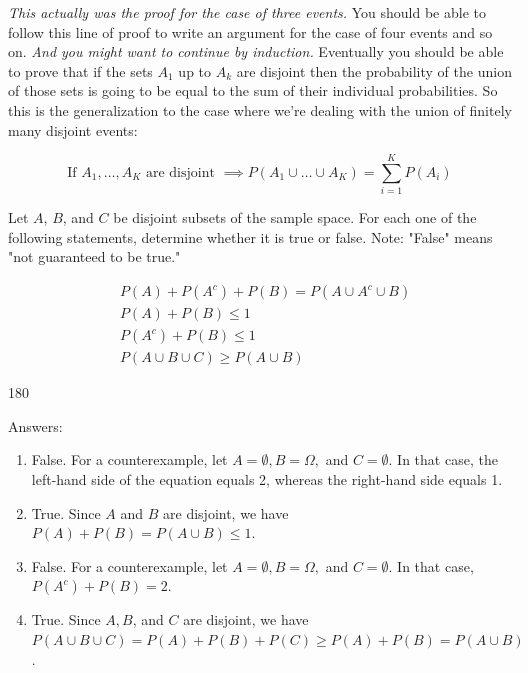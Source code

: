 \documentclass{tufte-handout}
\begin{document}
\textit{This actually was the proof for the case of three events.} You should be able to follow this line of proof to write an
argument for the case of four events and so on. \textit{And you might want to continue by induction.} 
Eventually you should be able to prove that if the sets $A_1$ up to $A_k$ are disjoint then the probability of the
union of those sets is going to be equal to the sum of their individual probabilities. So this is the
generalization to the case where we're dealing with the union of finitely many disjoint events:

$$
\text{If } A_1, \ldots, A_K\text{ are disjoint } \implies P( A_1 \cup \ldots \cup A_K) = \sum_{i = 1}^K P(A_i)
$$



Let $A$, $B$, and $C$ be disjoint subsets of the sample space. For each one of the following statements, determine whether it is true or false. Note: "False" means "not guaranteed to be true."

\begin{align}
&P(A) + P(A^c) + P(B) = P(A \cup A^c \cup B) \\
&P(A) + P(B) \leq 1 \\
&P(A^c) + P(B) \leq 1 \\
&P(A \cup B \cup C) \geq P(A \cup B)
\end{align}

\vspace{1cm}

\begin{turn}{180} 
\color{teal}
\begin{minipage}{\linewidth}
Answers:
\scriptsize
\begin{enumerate}[(1)]
\item  False.  For a counterexample, let $A = \emptyset, B = \Omega,$ and $C = \emptyset$. In that case, the left-hand side of the equation equals 2, whereas the right-hand side equals 1.
\item  True. Since $A$ and $B$ are disjoint, we have $P(A) + P(B) = P(A \cup B) \leq 1.$ \newline
\item False. For a counterexample, let $A = \emptyset, B = \Omega,$ and $C = \emptyset$. In that case, $P(A^c) + P(B) = 2$.
\item  True. Since $A, B$, and $C$ are disjoint, we have $P(A \cup B \cup C) = P(A) + P(B) + P(C) \geq  P(A) + P(B) = P(A \cup B)$.
\end{enumerate}
\end{minipage}
\end{turn}
\end{document}
